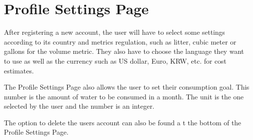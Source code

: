 \documentclass[10pt]{article}
\begin{document}
\section{Profile Settings Page}
After registering a new account, the user will have to select some settings according to its country and metrics regulation, such as litter, cubic meter or gallons for the volume metric. They also have to choose the language they want to use as well as the currency such as US dollar, Euro, KRW, etc. for cost estimates.

The Profile Settings Page also allows the user to set their consumption goal. This number is the amount of water to be consumed in a month. The unit is the one selected by the user and the number is an integer.

The option to delete the users account can also be found a t the bottom of the Profile Settings Page.
\end{document}
